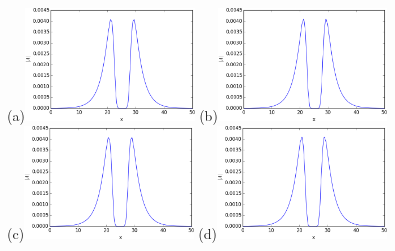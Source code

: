 \documentclass[mathserif, handout]{beamer}
\begin{document}
\begin{frame}[allowframebreaks]
  \begin{figure}[h]
    \centering
    (a)\includegraphics[width=0.4\textwidth]{cqcglReq1V1Real}
    (b)\includegraphics[width=0.4\textwidth]{cqcglReq1V1Imag} \\
    (c)\includegraphics[width=0.4\textwidth]{cqcglReq1ReflectV1Real}
    (d)\includegraphics[width=0.4\textwidth]{cqcglReq1ReflectV1Imag}
    \label{fig:req1eigenvectors}
  \end{figure}

\end{frame}
\end{document}
